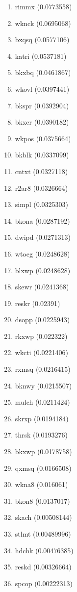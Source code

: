 \begin{enumerate}
\item rimmx (0.0773558)
\item wknck (0.0695068)
\item bxqsq (0.0577106)
\item katri (0.0537181)
\item bkxbq (0.0461867)
\item wkovl (0.0397441)
\item bkspr (0.0392904)
\item bkxcr (0.0390182)
\item wkpos (0.0375664)
\item bkblk (0.0337099)
\item cntxt (0.0327118)
\item r2ar8 (0.0326664)
\item simpl (0.0325303)
\item bkona (0.0287192)
\item dwipd (0.0271313)
\item wtoeg (0.0248628)
\item blxwp (0.0248628)
\item skewr (0.0241368)
\item reskr (0.02391)
\item dsopp (0.0225943)
\item rkxwp (0.022322)
\item wkcti (0.0221406)
\item rxmsq (0.0216415)
\item bknwy (0.0215507)
\item mulch (0.0211424)
\item skrxp (0.0194184)
\item thrsk (0.0193276)
\item bkxwp (0.0178758)
\item qxmsq (0.0166508)
\item wkna8 (0.016061)
\item bkon8 (0.0137017)
\item skach (0.00508144)
\item stlmt (0.00489996)
\item hdchk (0.00476385)
\item reskd (0.00326664)
\item spcop (0.00222313)
\end{enumerate}
